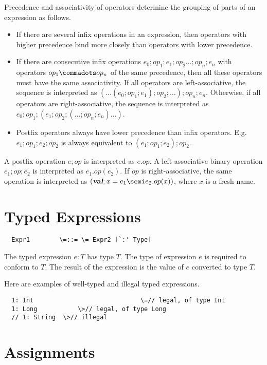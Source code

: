 \documentclass[11pt]{report}
\begin{document}
\begin{itemize}
Precedence and associativity of operators determine the grouping of
parts of an expression as follows.
\begin{itemize}
\item If there are several infix operations in an
expression, then operators with higher precedence bind more closely
than operators with lower precedence.
\item If there are consecutive infix
operations $e_0;op_1;e_1;op_2\ldots;op_n;e_n$ with operators $op_1
\commadots op_n$ of the same precedence, then all these operators must
have the same associativity. If all operators are left-associative,
the sequence is interpreted as $(\ldots(e_0;op_1;e_1);op_2;\ldots);
op_n;e_n$. Otherwise, if all operators are right-associative, the
sequence is interpreted as
$e_0;op_1;(e_1;op_2;(\ldots;op_n;e_n)\ldots)$.
\item
Postfix operators always have lower precedence than infix
operators. E.g.\ $e_1;op_1;e_2;op_2$ is always equivalent to
$(e_1;op_1;e_2);op_2$.
\end{itemize}
A postfix operation $e;op$ is interpreted as $e.op$. A
left-associative binary operation $e_1;op;e_2$ is interpreted as
$e_1.op(e_2)$. If $op$ is right-associative, the same operation is
interpreted as $(\VAL;x=e_1
\semi e_2.op(x))$, where $x$ is a fresh name.

\section{Typed Expressions}

\syntax\begin{verbatim}
  Expr1	       \=::= \= Expr2 [`:' Type]
\end{verbatim}

The typed expression $e: T$ has type $T$. The type of expression $e$
is required to conform to $T$. The result of the expression is the
value of $e$ converted to type $T$.

\example Here are examples of well-typed and illegal typed expressions.

\begin{verbatim}
  1: Int                             \=// legal, of type Int
  1: Long	    	\>// legal, of type Long
  // 1: String 	\>// illegal
\end{verbatim}

\section{Assignments}


\end{itemize}
\end{document}
